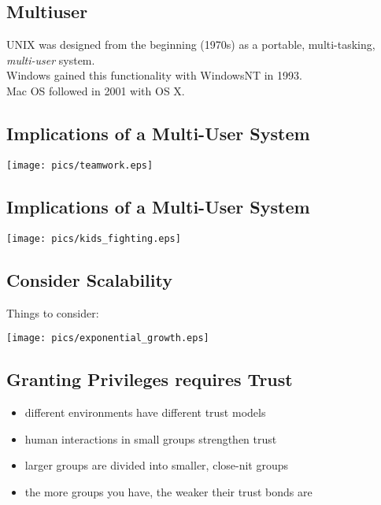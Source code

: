 \documentclass[xga]{xdvislides}
\begin{document}
\subsection{Multiuser}

UNIX was designed from the beginning (1970s) as a portable, multi-tasking,
{\em multi-user} system. \\

Windows gained this functionality with WindowsNT in 1993. \\

Mac OS followed in 2001 with OS X.

\subsection{Implications of a Multi-User System}
\vspace*{\fill}
\begin{center}
	\texttt{[image: pics/teamwork.eps]}
\end{center}
\vspace*{\fill}

\subsection{Implications of a Multi-User System}
\vspace*{\fill}
\begin{center}
	\texttt{[image: pics/kids\_fighting.eps]}
\end{center}
\vspace*{\fill}

\subsection{Consider Scalability}
Things to consider:
\\

\begin{center}
	\texttt{[image: pics/exponential\_growth.eps]}
\end{center}


\subsection{Granting Privileges requires Trust}
\begin{itemize}
	\item different environments have different trust models
	\item human interactions in small groups strengthen trust
	\item larger groups are divided into smaller, close-nit groups
	\item the more groups you have, the weaker their trust bonds are
\end{itemize}
\end{document}
